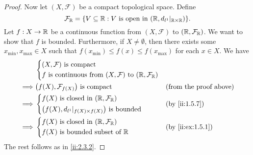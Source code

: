 \begin{proof}
  Now let \((X, \mathcal{F})\) be a compact topological space.
  Define
  \[
    \mathcal{F}_{\R} = \set{V \subseteq \R : V \text{ is open in } (\R, d_{l^1}|_{\R \times \R})}.
  \]
  Let \(f : X \to \mathbb{R}\) be a continuous function from \((X, \mathcal{F})\) to \((\mathbb{R}, \mathcal{F}_{\mathbb{R}})\).
  We want to show that \(f\) is bounded.
  Furthermore, if \(X \neq \emptyset\), then there exists some \(x_{\min}, x_{\max} \in X\) such that \(f(x_{\min}) \leq f(x) \leq f(x_{\max})\) for each \(x \in X\).
  We have
  \begin{align*}
             & \begin{dcases}
                 (X, \mathcal{F}) \text{ is compact} \\
                 f \text{ is continuous from } (X, \mathcal{F}) \text{ to } (\R, \mathcal{F}_{\R})
               \end{dcases}                                     \\
    \implies & \big(f(X), \mathcal{F}_{f(X)}\big) \text{ is compact}                             &  & \text{(from the proof above)} \\
    \implies & \begin{dcases}
                 f(X) \text{ is closed in } (\R, \mathcal{F}_{\R}) \\
                 \big(f(X), d_{l^1}|_{f(X) \times f(X)}\big) \text{ is bounded}
               \end{dcases}                    &  & \by{ii:1.5.7}                                                        \\
    \implies & \begin{dcases}
                 f(X) \text{ is closed in } (\R, \mathcal{F}_{\R}) \\
                 f(X) \text{ is bounded subset of } \R
               \end{dcases}                              &  & \by{ii:ex:1.5.1}
  \end{align*}
  The rest follows as in \cref{ii:2.3.2}.
\end{proof}
